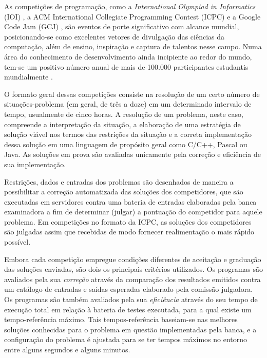 \documentclass[ruledheader, 12pt]{abnt}
\begin{document}

As competições de programação, como a \emph{International Olympiad in Informatics} (IOI) \cite{ioinformatics}, a ACM International Collegiate Programming Contest (ICPC) \cite{acmicpc} e a Google Code Jam (GCJ) \cite{googlecodejam}, são eventos de porte significativo com alcance mundial, posicionando-se como excelentes vetores de divulgação das ciências da computação, além de ensino, inspiração e captura de talentos nesse campo. Numa área do conhecimento de desenvolvimento ainda incipiente ao redor do mundo, tem-se um positivo número anual de mais de 100.000 participantes estudantis mundialmente \cite{icpcfactsheet,wang2010selection}.

O formato geral dessas competições consiste na resolução de um certo número de situações-problema (em geral, de três a doze) em um determinado intervalo de tempo, usualmente de cinco horas. A resolução de um problema, neste caso, compreende a interpretação da situação, a elaboração de uma estratégia de solução viável nos termos das restrições da situação e a correta implementação dessa solução em uma linguagem de propósito geral como C/C++, Pascal ou Java. As soluções em prova são avaliadas unicamente pela correção e eficiência de sua implementação. 

Restrições, dados e entradas dos problemas são desenhados de maneira a possibilitar a correção automatizada das soluções dos competidores, que são executadas em servidores contra uma bateria de entradas elaboradas pela banca examinadora a fim de determinar (julgar) a pontuação do competidor para aquele problema. Em competições no formato da ICPC, as soluções dos competidores são julgadas assim que recebidas de modo fornecer realimentação o mais rápido possível.

Embora cada competição empregue condições diferentes de aceitação e graduação das soluções enviadas, são dois os principais critérios utilizados. Os programas são avaliados pela sua \emph{correção} através da comparação dos resultados emitidos contra um catálogo de entradas e saídas esperadas elaborado pela comissão julgadora. Os programas são também avaliados pela sua \emph{eficiência} através do seu tempo de execução total em relação à bateria de testes executada, para a qual existe um tempo-referência máximo. Tais tempos-referência baseiam-se nas melhores soluções conhecidas para o problema em questão implementadas pela banca, e a configuração do problema é ajustada para se ter tempos máximos no entorno entre alguns segundos e alguns minutos.
\end{document}
